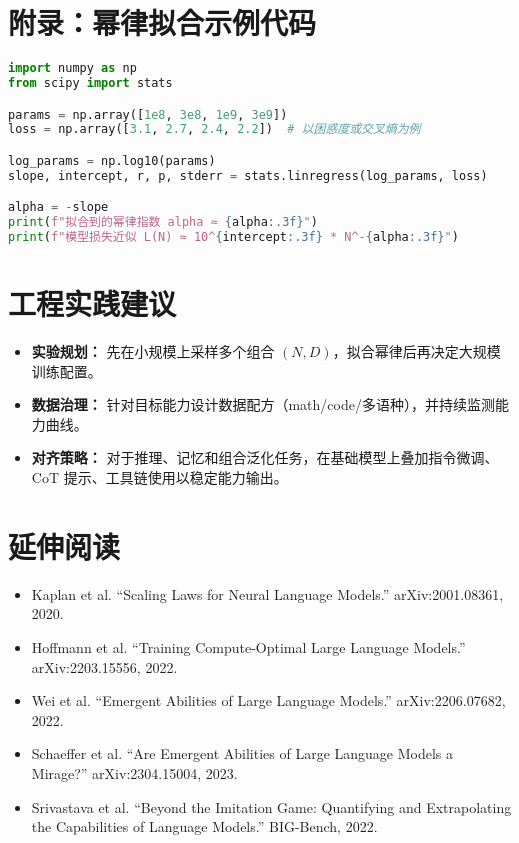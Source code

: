 \documentclass[UTF8,zihao=-4]{ctexart}
\begin{document}
\section{附录：幂律拟合示例代码}
\begin{lstlisting}[language=Python,caption={根据实验点拟合规模幂律指数的示例},label={lst:powerlaw_cn}]
import numpy as np
from scipy import stats

params = np.array([1e8, 3e8, 1e9, 3e9])
loss = np.array([3.1, 2.7, 2.4, 2.2])  # 以困惑度或交叉熵为例

log_params = np.log10(params)
slope, intercept, r, p, stderr = stats.linregress(log_params, loss)

alpha = -slope
print(f"拟合到的幂律指数 alpha ≈ {alpha:.3f}")
print(f"模型损失近似 L(N) ≈ 10^{intercept:.3f} * N^-{alpha:.3f}")
\end{lstlisting}

\section{工程实践建议}
\begin{itemize}
  \item \textbf{实验规划：} 先在小规模上采样多个组合 $(N, D)$，拟合幂律后再决定大规模训练配置。
  \item \textbf{数据治理：} 针对目标能力设计数据配方（math/code/多语种），并持续监测能力曲线。
  \item \textbf{对齐策略：} 对于推理、记忆和组合泛化任务，在基础模型上叠加指令微调、CoT 提示、工具链使用以稳定能力输出。
\end{itemize}

\section*{延伸阅读}
\begin{itemize}
  \item Kaplan et al. ``Scaling Laws for Neural Language Models.'' arXiv:2001.08361, 2020.
  \item Hoffmann et al. ``Training Compute-Optimal Large Language Models.'' arXiv:2203.15556, 2022.
  \item Wei et al. ``Emergent Abilities of Large Language Models.'' arXiv:2206.07682, 2022.
  \item Schaeffer et al. ``Are Emergent Abilities of Large Language Models a Mirage?'' arXiv:2304.15004, 2023.
  \item Srivastava et al. ``Beyond the Imitation Game: Quantifying and Extrapolating the Capabilities of Language Models.'' BIG-Bench, 2022.
\end{itemize}
\end{document}
